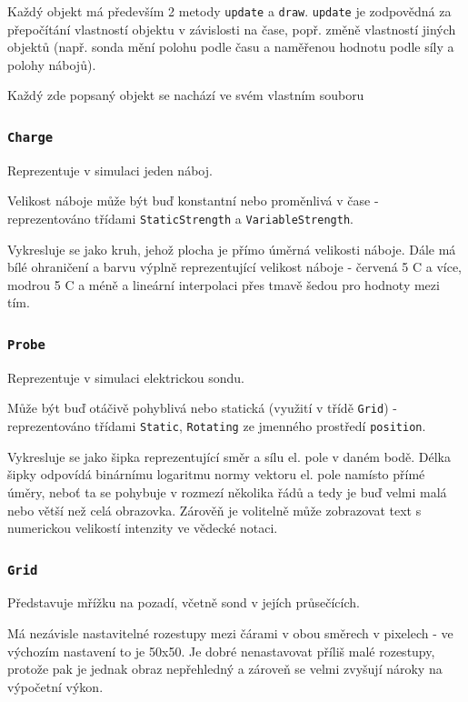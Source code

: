 \documentclass[12pt]{article}
\newcommand{\code}[1]{\texttt{#1}}
\begin{document}
Každý objekt má především 2 metody \code{update} a \code{draw}. \code{update} je
zodpovědná za přepočítání vlastností objektu v závislosti na čase, popř. změně
vlastností jiných objektů (např. sonda mění polohu podle času a naměřenou
hodnotu podle síly a polohy nábojů).

Každý zde popsaný objekt se nachází ve svém vlastním souboru

\subsubsection{\code{Charge}}

Reprezentuje v simulaci jeden náboj. 

Velikost náboje může být buď konstantní nebo proměnlivá v čase - reprezentováno
třídami \code{StaticStrength} a \code{VariableStrength}. 

Vykresluje se jako kruh, jehož plocha je přímo úměrná velikosti náboje. Dále má
bílé ohraničení a barvu výplně reprezentující velikost náboje - červená 5 C a více,
modrou 5 C a méně a lineární interpolaci přes tmavě šedou pro hodnoty mezi tím.

\subsubsection{\code{Probe}}

Reprezentuje v simulaci elektrickou sondu.

Může být buď otáčivě pohyblivá nebo statická (využití v třídě \code{Grid}) -
reprezentováno třídami \code{Static}, \code{Rotating} ze jmenného prostředí
\code{position}.

Vykresluje se jako šipka reprezentující směr a sílu el. pole v daném bodě.
Délka šipky odpovídá binárnímu logaritmu normy vektoru el. pole namísto přímé
úměry, neboť ta se pohybuje v rozmezí několika řádů a tedy je buď velmi malá
nebo větší než celá obrazovka. Zárověň je volitelně může zobrazovat text s
numerickou velikostí intenzity ve vědecké notaci.

\subsubsection{\code{Grid}}

Představuje mřížku na pozadí, včetně sond v jejích průsečících.

Má nezávisle nastavitelné rozestupy mezi čárami v obou směrech v pixelech - ve
výchozím nastavení to je 50x50. Je dobré nenastavovat příliš malé rozestupy,
protože pak je jednak obraz nepřehledný a zároveň se velmi zvyšují nároky na
výpočetní výkon.
\end{document}
